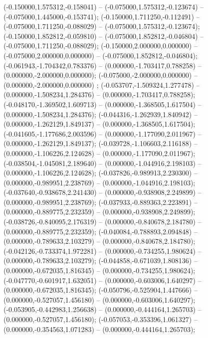  (-0.150000,1.575312,-0.158041) -- (-0.075000,1.575312,-0.123674) -- (-0.075000,1.445000,-0.153741);
 (-0.150000,1.711250,-0.112491) -- (-0.075000,1.711250,-0.088029) -- (-0.075000,1.575312,-0.123674);
 (-0.150000,1.852812,-0.059810) -- (-0.075000,1.852812,-0.046804) -- (-0.075000,1.711250,-0.088029);
 (-0.150000,2.000000,0.000000) -- (-0.075000,2.000000,0.000000) -- (-0.075000,1.852812,-0.046804);
 (-0.061943,-1.704342,0.783376) -- (0.000000,-1.703417,0.788258) -- (0.000000,-2.000000,0.000000);
 (-0.075000,-2.000000,0.000000) -- (0.000000,-2.000000,0.000000) ;
 (-0.053707,-1.509324,1.277478) -- (0.000000,-1.508234,1.284376) -- (0.000000,-1.703417,0.788258);
 (-0.048170,-1.369502,1.609713) -- (0.000000,-1.368505,1.617504) -- (0.000000,-1.508234,1.284376);
 (-0.044316,-1.262939,1.840942) -- (0.000000,-1.262129,1.849137) -- (0.000000,-1.368505,1.617504);
 (-0.041605,-1.177686,2.003596) -- (0.000000,-1.177090,2.011967) -- (0.000000,-1.262129,1.849137);
 (-0.039728,-1.106603,2.116188) -- (0.000000,-1.106226,2.124628) -- (0.000000,-1.177090,2.011967);
 (-0.038504,-1.045081,2.189640) -- (0.000000,-1.044916,2.198103) -- (0.000000,-1.106226,2.124628);
 (-0.037826,-0.989913,2.230300) -- (0.000000,-0.989951,2.238769) -- (0.000000,-1.044916,2.198103);
 (-0.037640,-0.938678,2.241430) -- (0.000000,-0.938908,2.249899) -- (0.000000,-0.989951,2.238769);
 (-0.037933,-0.889363,2.223891) -- (0.000000,-0.889775,2.232359) -- (0.000000,-0.938908,2.249899);
 (-0.038726,-0.840095,2.176319) -- (0.000000,-0.840678,2.184780) -- (0.000000,-0.889775,2.232359);
 (-0.040084,-0.788893,2.094848) -- (0.000000,-0.789633,2.103279) -- (0.000000,-0.840678,2.184780);
 (-0.042126,-0.733374,1.972281) -- (0.000000,-0.734255,1.980624) -- (0.000000,-0.789633,2.103279);
 (-0.044858,-0.671039,1.808136) -- (0.000000,-0.672035,1.816345) -- (0.000000,-0.734255,1.980624);
 (-0.047770,-0.601917,1.632051) -- (0.000000,-0.603006,1.640297) -- (0.000000,-0.672035,1.816345);
 (-0.050796,-0.525904,1.447666) -- (0.000000,-0.527057,1.456180) -- (0.000000,-0.603006,1.640297);
 (-0.053905,-0.442983,1.256638) -- (0.000000,-0.444164,1.265703) -- (0.000000,-0.527057,1.456180);
 (-0.057053,-0.353396,1.061327) -- (0.000000,-0.354563,1.071283) -- (0.000000,-0.444164,1.265703);
